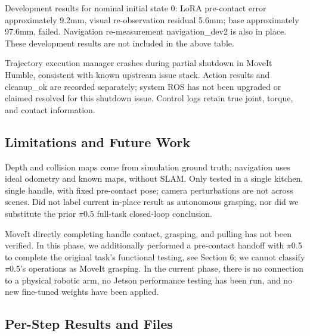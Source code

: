 Development results for nominal initial state 0: LoRA pre-contact error approximately 9.2mm, visual re-observation residual 5.6mm; base approximately 97.6mm, failed. Navigation re-measurement navigation\_dev2 is also in place. These development results are not included in the above table.

Trajectory execution manager crashes during partial shutdown in MoveIt Humble, consistent with known upstream issue stack. Action results and cleanup\_ok are recorded separately; system ROS has not been upgraded or claimed resolved for this shutdown issue. Control logs retain true joint, torque, and contact information.

\subsection{Limitations and Future Work}\label{s19-detail-4}

Depth and collision maps come from simulation ground truth; navigation uses ideal odometry and known maps, without SLAM. Only tested in a single kitchen, single handle, with fixed pre-contact pose; camera perturbations are not across scenes. Did not label current in-place result as autonomous grasping, nor did we substitute the prior \(\pi\)0.5 full-task closed-loop conclusion.

MoveIt directly completing handle contact, grasping, and pulling has not been verified. In this phase, we additionally performed a pre-contact handoff with \(\pi\)0.5 to complete the original task's functional testing, see Section 6; we cannot classify \(\pi\)0.5's operations as MoveIt grasping. In the current phase, there is no connection to a physical robotic arm, no Jetson performance testing has been run, and no new fine-tuned weights have been applied.

\subsection{Per-Step Results and Files}\label{s19-detail-5}

